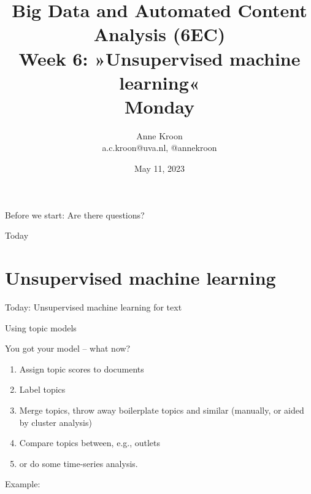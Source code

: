 

\graphicspath{{../../resources/img/}}




\title[Big Data and Automated Content Analysis]{\textbf{Big Data and Automated Content Analysis (6EC)} 
\\Week 6: »Unsupervised machine learning«
\\Monday}
\author[Anne Kroon]{Anne Kroon\\ \footnotesize{a.c.kroon@uva.nl, @annekroon \\}}
\date{May 11, 2023}


\begin{frame}{}
	\titlepage
\end{frame}

\begin{frame}[standout]
Before we start: Are there questions?
\end{frame}


\begin{frame}{Today}
	\tableofcontents
\end{frame}

\section{Unsupervised machine learning}

\begin{frame}[standout]
Today: Unsupervised machine learning for text
\end{frame}

\begin{frame}{Using topic models}

	You got your model -- what now?
	
	\begin{enumerate}
	\item Assign topic scores to documents
	\item Label topics
	\item Merge topics, throw away boilerplate topics and similar (manually, or aided by cluster analysis)
	\item Compare topics between, e.g., outlets
	\item or do some time-series analysis.
	\end{enumerate}
	
	
	Example: \cite{Tsur2015}
	
	\end{frame}
	

